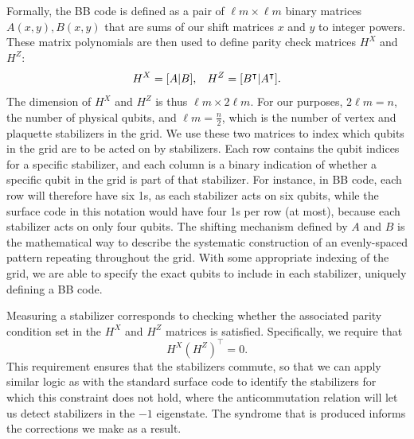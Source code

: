Formally, the BB code is defined as a pair of $\ell m \times \ell m$ binary matrices $A(x, y), B(x,y)$ that are sums of our shift matrices $x$ and $y$ to integer powers. These matrix polynomials are then used to define parity check matrices $H^X$ and $H^Z$:
\[H^X = [A | B], \hspace{0.3cm} H^Z = [B^\intercal | A^\intercal].\]
The dimension of $H^X$ and $H^Z$ is thus $\ell m \times 2 \ell m$. For our purposes, $2 \ell m = n$, the number of physical qubits, and $ \ell m = \frac{n}{2}$, which is the number of vertex and plaquette stabilizers in the grid. 
We use these two matrices to index which qubits in the grid are to be acted on by stabilizers. Each row contains the qubit indices for a specific stabilizer, and each column is a binary indication of whether a specific qubit in the grid is part of that stabilizer. For instance, in BB code, each row will therefore have six 1s, as each stabilizer acts on six qubits, while the surface code in this notation would have four 1s per row (at most), because each stabilizer acts on only four qubits. The shifting mechanism defined by $A$ and $B$ is the mathematical way to describe the systematic construction of an evenly-spaced pattern repeating throughout the grid. With some appropriate indexing of the grid, we are able to specify the exact qubits to include in each stabilizer, uniquely defining a BB code.

Measuring a stabilizer corresponds to checking whether the associated parity condition set in the $H^X$ and $H^Z$ matrices is satisfied. Specifically, we require that
\[
H^X (H^Z)^\intercal = 0.\]
This requirement ensures that the stabilizers commute, so that we can apply similar logic as with the standard surface code to identify the stabilizers for which this constraint does not hold, where the anticommutation relation will let us detect stabilizers in the $-1$ eigenstate. The syndrome that is produced informs the corrections we make as a result.


